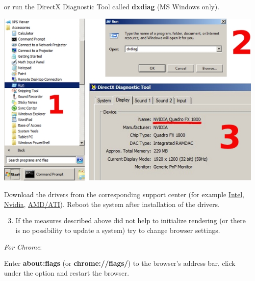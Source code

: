\documentclass[a4paper,12pt,oneside]{sphinxmanual}
\begin{document}
\begin{DUlineblock}{0em}
\item[] 
\end{DUlineblock}

or run the DirectX Diagnostic Tool called \textbf{dxdiag} (MS Windows only).

\begin{DUlineblock}{0em}
\item[] 
\end{DUlineblock}

{\hfill\includegraphics[width=1.000\linewidth]{dxdiag.jpg}\hfill}

\begin{DUlineblock}{0em}
\item[] 
\end{DUlineblock}

Download the drivers from the corresponding support center (for example \href{http://downloadcenter.intel.com/Default.aspx}{Intel}, \href{http://www.nvidia.com/Download/index.aspx}{Nvidia}, \href{http://support.amd.com/en-us/download}{AMD/ATI}). Reboot the system after installation of the drivers.
\begin{enumerate}
\setcounter{enumi}{2}
\item {} 
If the measures described above did not help to initialize rendering (or there is no possibility to update a system) try to change browser settings.

\end{enumerate}

\emph{For Chrome}:

Enter \textbf{about:flags} (or \textbf{chrome://flags/}) to the browser's address bar, click  under the  option and restart the browser.
\end{document}
